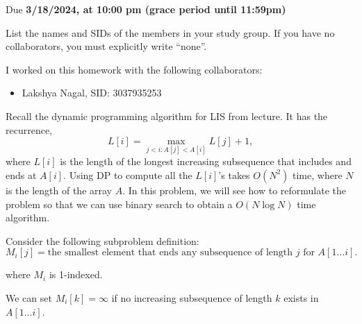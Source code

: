 \documentclass[11pt]{article}
\def\duedate{3/18/2024, at 10:00 pm (grace period until 11:59pm)}
\begin{document}
\maketitle

Due \textbf{\duedate}

List the names and SIDs of the members in your study group.
If you have no collaborators, you must explicitly write ``none''.

\begin{solution} I worked on this homework with the following collaborators:
\begin{itemize}
    \item Lakshya Nagal, SID: 3037935253
\end{itemize}
\end{solution}


Recall the dynamic programming algorithm for LIS from lecture. It has the recurrence, 
\[
    L[i] = \max_{j < i : A[j] < A[i]} L[j]+1,
\]
where $L[i]$ is the length of the longest increasing subsequence that includes and ends at $A[i]$. Using DP to compute all the $L[i]$'s takes $O(N^2)$ time, where $N$ is the length of the array $A$. In this problem, we will see how to reformulate the problem so that we can use binary search to obtain a $O(N\log N)$ time algorithm.

Consider the following subproblem definition:
\[M_i[j] = \text{the smallest element that ends any subsequence of length $j$ for $A[1 \dots i]$}.\]

where $M_i$ is 1-indexed. 

We can set $M_i[k]=\infty$ if no increasing subsequence of length $k$ exists in $A[1\dots i]$.
\end{document}
